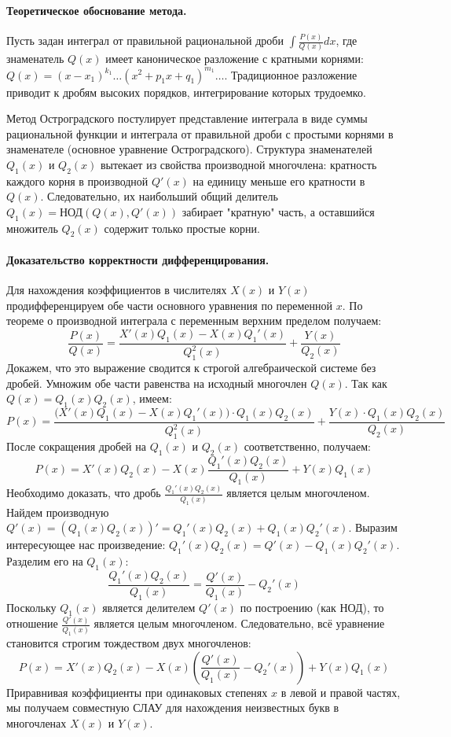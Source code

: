 \paragraph{Теоретическое обоснование метода.}
Пусть задан интеграл от правильной рациональной дроби $\int \frac{P(x)}{Q(x)} dx$, где знаменатель $Q(x)$ имеет каноническое разложение с кратными корнями: $Q(x) = (x-x_1)^{k_1}\dots(x^2+p_1x+q_1)^{m_1}\dots$. Традиционное разложение приводит к дробям высоких порядков, интегрирование которых трудоемко.

Метод Остроградского постулирует представление интеграла в виде суммы рациональной функции и интеграла от правильной дроби с простыми корнями в знаменателе (основное уравнение Остроградского). Структура знаменателей $Q_1(x)$ и $Q_2(x)$ вытекает из свойства производной многочлена: кратность каждого корня в производной $Q'(x)$ на единицу меньше его кратности в $Q(x)$. Следовательно, их наибольший общий делитель $Q_1(x) = \text{НОД}(Q(x), Q'(x))$ забирает "кратную" часть, а оставшийся множитель $Q_2(x)$ содержит только простые корни.

\paragraph{Доказательство корректности дифференцирования.}
Для нахождения коэффициентов в числителях $X(x)$ и $Y(x)$ продифференцируем обе части основного уравнения по переменной $x$. По теореме о производной интеграла с переменным верхним пределом получаем:
$$ \frac{P(x)}{Q(x)} = \frac{X'(x)Q_1(x) - X(x)Q_1'(x)}{Q_1^2(x)} + \frac{Y(x)}{Q_2(x)} $$
Докажем, что это выражение сводится к строгой алгебраической системе без дробей. Умножим обе части равенства на исходный многочлен $Q(x)$. Так как $Q(x) = Q_1(x)Q_2(x)$, имеем:
$$ P(x) = \frac{\big(X'(x)Q_1(x) - X(x)Q_1'(x)\big) \cdot Q_1(x)Q_2(x)}{Q_1^2(x)} + \frac{Y(x) \cdot Q_1(x)Q_2(x)}{Q_2(x)} $$
После сокращения дробей на $Q_1(x)$ и $Q_2(x)$ соответственно, получаем:
$$ P(x) = X'(x)Q_2(x) - X(x) \frac{Q_1'(x)Q_2(x)}{Q_1(x)} + Y(x)Q_1(x) $$
Необходимо доказать, что дробь $\frac{Q_1'(x)Q_2(x)}{Q_1(x)}$ является целым многочленом. Найдем производную $Q'(x) = (Q_1(x)Q_2(x))' = Q_1'(x)Q_2(x) + Q_1(x)Q_2'(x)$. Выразим интересующее нас произведение: $Q_1'(x)Q_2(x) = Q'(x) - Q_1(x)Q_2'(x)$. 
Разделим его на $Q_1(x)$:
$$ \frac{Q_1'(x)Q_2(x)}{Q_1(x)} = \frac{Q'(x)}{Q_1(x)} - Q_2'(x) $$
Поскольку $Q_1(x)$ является делителем $Q'(x)$ по построению (как НОД), то отношение $\frac{Q'(x)}{Q_1(x)}$ является целым многочленом. Следовательно, всё уравнение становится строгим тождеством двух многочленов:
$$ P(x) = X'(x)Q_2(x) - X(x) \left( \frac{Q'(x)}{Q_1(x)} - Q_2'(x) \right) + Y(x)Q_1(x) $$
Приравнивая коэффициенты при одинаковых степенях $x$ в левой и правой частях, мы получаем совместную СЛАУ для нахождения неизвестных букв в многочленах $X(x)$ и $Y(x)$.

